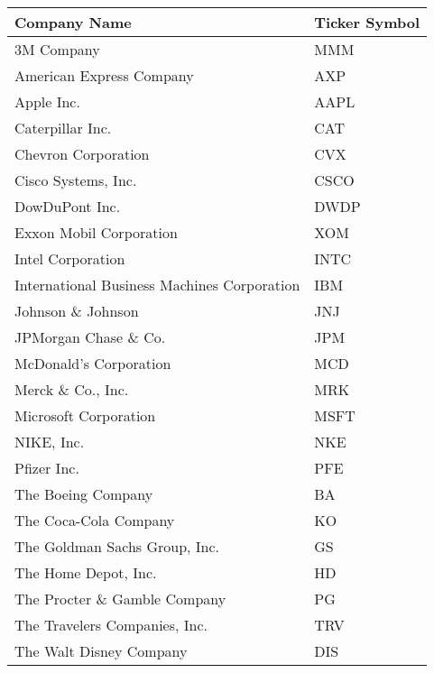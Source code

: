 \begin{tabular}{ll}
\toprule
                                Company Name & Ticker Symbol \\
\midrule
                                  3M Company &           MMM \\
                    American Express Company &           AXP \\
                                  Apple Inc. &          AAPL \\
                            Caterpillar Inc. &           CAT \\
                         Chevron Corporation &           CVX \\
                         Cisco Systems, Inc. &          CSCO \\
                              DowDuPont Inc. &          DWDP \\
                     Exxon Mobil Corporation &           XOM \\
                           Intel Corporation &          INTC \\
 International Business Machines Corporation &           IBM \\
                           Johnson \& Johnson &           JNJ \\
                        JPMorgan Chase \& Co. &           JPM \\
                      McDonald's Corporation &           MCD \\
                           Merck \& Co., Inc. &           MRK \\
                       Microsoft Corporation &          MSFT \\
                                  NIKE, Inc. &           NKE \\
                                 Pfizer Inc. &           PFE \\
                          The Boeing Company &            BA \\
                       The Coca-Cola Company &            KO \\
               The Goldman Sachs Group, Inc. &            GS \\
                        The Home Depot, Inc. &            HD \\
                The Procter \& Gamble Company &            PG \\
               The Travelers Companies, Inc. &           TRV \\
                     The Walt Disney Company &           DIS \\

\end{tabular}

